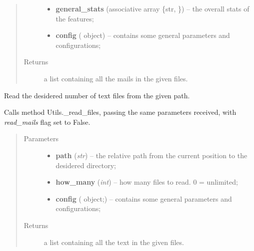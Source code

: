 \documentclass[letterpaper,10pt,english]{sphinxmanual}
\begin{document}
\begin{fulllineitems}
\begin{fulllineitems}
\begin{quote}
\begin{description}
\begin{itemize}
\item {} 
\textbf{general\_stats} (associative array \{str, {\hyperref[index:gen_stat.Stat]{}}\}) -- the overall stats of the features;

\item {} 
\textbf{config} ({\hyperref[index:config.Config]{}} object) -- contains some general parameters and configurations;

\end{itemize}

\item[{Returns}] \leavevmode
a list containing all the mails in the given files.

\end{description}\end{quote}

\end{fulllineitems}


\begin{fulllineitems}
\label{index:utils.Utils.read_text}
Read the desidered number of text files from the given path.

Calls method Utils.\_read\_files, passing the same parameters received,
with \emph{read\_mails} flag set to False.
\begin{quote}\begin{description}
\item[{Parameters}] \leavevmode\begin{itemize}
\item {} 
\textbf{path} (\emph{str}) -- the relative path from the current position             to the desidered directory;

\item {} 
\textbf{how\_many} (\emph{int}) -- how many files to read. 0 = unlimited;

\item {} 
\textbf{config} ({\hyperref[index:config.Config]{}} object;) -- contains some general parameters and configurations;

\end{itemize}

\item[{Returns}] \leavevmode
a list containing all the text in the given files.

\end{description}\end{quote}

\end{fulllineitems}


\end{fulllineitems}
\end{document}

